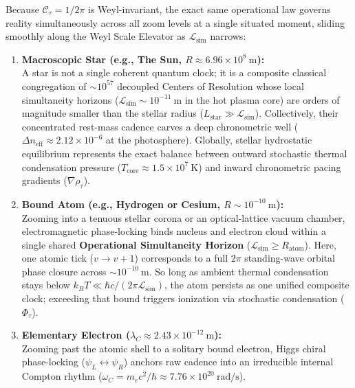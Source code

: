 \documentclass[
]{article}
\providecommand{\tightlist}{%
  \setlength{\itemsep}{0pt}\setlength{\parskip}{0pt}}
\begin{document}
Because \(\mathcal{C}_\tau = 1/2\pi\) is Weyl-invariant, the exact same
operational law governs reality simultaneously across all zoom levels at
a single situated moment, sliding smoothly along the Weyl Scale Elevator
as \(\mathcal{L}_{\mathrm{sim}}\) narrows:

\begin{enumerate}
\def\labelenumi{\arabic{enumi}.}
\tightlist
\item
  \textbf{Macroscopic Star (e.g., The Sun,
  \(R \approx 6.96 \times 10^8\ \text{m}\)):}\\
  A star is not a single coherent quantum clock; it is a composite
  classical congregation of \(\sim 10^{57}\) decoupled Centers of
  Resolution whose local simultaneity horizons
  (\(\mathcal{L}_{\mathrm{sim}} \sim 10^{-11}\ \text{m}\) in the hot
  plasma core) are orders of magnitude smaller than the stellar radius
  (\(L_{\mathrm{star}} \gg \mathcal{L}_{\mathrm{sim}}\)). Collectively,
  their concentrated rest-mass cadence carves a deep chronometric well
  (\(\Delta n_{\mathrm{eff}} \approx 2.12 \times 10^{-6}\) at the
  photosphere). Globally, stellar hydrostatic equilibrium represents the
  exact balance between outward stochastic thermal condensation pressure
  (\(T_{\mathrm{core}} \approx 1.5 \times 10^7\ \text{K}\)) and inward
  chronometric pacing gradients (\(\nabla \rho_\tau\)).
\item
  \textbf{Bound Atom (e.g., Hydrogen or Cesium,
  \(R \sim 10^{-10}\ \text{m}\)):}\\
  Zooming into a tenuous stellar corona or an optical-lattice vacuum
  chamber, electromagnetic phase-locking binds nucleus and electron
  cloud within a single shared \textbf{Operational Simultaneity Horizon}
  (\(\mathcal{L}_{\mathrm{sim}} \ge R_{\mathrm{atom}}\)). Here, one
  atomic tick (\(v \to v + 1\)) corresponds to a full \(2\pi\)
  standing-wave orbital phase closure across
  \(\sim 10^{-10}\ \text{m}\). So long as ambient thermal condensation
  stays below \(k_B T \ll \hbar c / (2\pi \mathcal{L}_{\mathrm{sim}})\),
  the atom persists as one unified composite clock; exceeding that bound
  triggers ionization via stochastic condensation (\(\Phi_\tau\)).
\item
  \textbf{Elementary Electron
  (\(\lambda_C \approx 2.43 \times 10^{-12}\ \text{m}\)):}\\
  Zooming past the atomic shell to a solitary bound electron, Higgs
  chiral phase-locking (\(\psi_L \leftrightarrow \psi_R\)) anchors raw
  cadence into an irreducible internal Compton rhythm
  (\(\omega_C = m_e c^2 / \hbar \approx 7.76 \times 10^{20}\ \text{rad/s}\)).

\end{enumerate}
\end{document}
